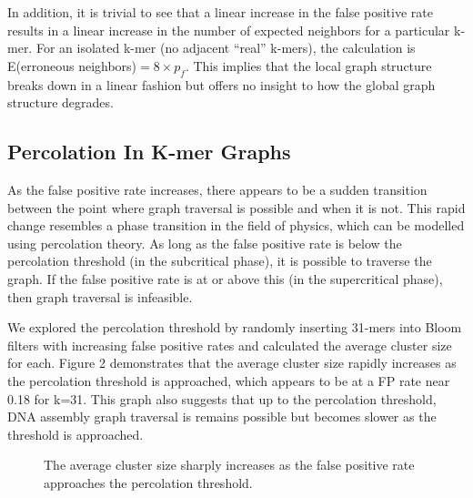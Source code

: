\documentclass[12pt]{article} \usepackage{simplemargins}
\begin{document}
In addition, it is trivial to see that a linear increase in the false 
positive rate results in a linear increase in the number of expected 
neighbors for a particular k-mer. For an isolated k-mer (no adjacent 
``real'' k-mers), the calculation is 
E(erroneous neighbors)$ = 8 \times p_f$. This implies that the local graph 
structure breaks down in a linear fashion but offers no insight 
to how the global graph structure degrades.

\subsection{Percolation In K-mer Graphs}
As the false positive rate increases, there appears to be a sudden
transition between the point where graph traversal is possible and
when it is not. This rapid change resembles a phase transition in the
field of physics, which can be modelled using percolation theory. As
long as the false positive rate is below the percolation threshold (in
the subcritical phase), it is possible to traverse the graph. If the
false positive rate is at or above this (in the supercritical phase), then graph
traversal is infeasible. 

We explored the percolation threshold by randomly inserting 31-mers into Bloom
filters with increasing false positive rates and calculated the average
cluster size for each. Figure 2 demonstrates that the average cluster
size rapidly increases as the percolation threshold is approached,
which appears to be at a FP rate near 0.18 for k=31. This
graph also suggests that up to the percolation threshold, DNA assembly graph 
traversal is remains possible but becomes slower as the threshold is
approached.

\begin{figure}
\caption{The average cluster size sharply increases as the false positive 
rate approaches the percolation threshold.
}
\end{figure}
\end{document}
